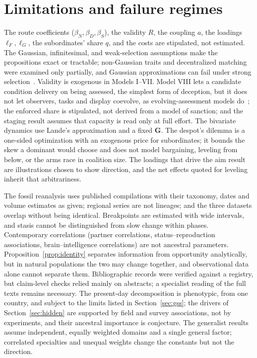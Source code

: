 \section{Limitations and failure regimes}\label{sec:limits}

\noindent The route coefficients ($\beta_N,\beta_D,\beta_S$), the validity $R$, the coupling $a$, the loadings
$\ell_F,\ell_G$, the subordinates' share $q$, and the costs are stipulated, not estimated. The Gaussian, infinitesimal, and
weak-selection assumptions make the propositions exact or tractable; non-Gaussian traits and decentralized matching were
examined only partially, and Gaussian approximations can fail under strong selection~\cite{turelli1994}. Validity is
exogenous in Models I--VII. Model VIII lets a candidate condition delivery on being assessed, the simplest form of
deception, but it does not let observers, tasks and display coevolve, as evolving-assessment models
do~\cite{gavrilets2006,baroudagues2022}; the enforced share is stipulated, not derived from a model of sanction; and the
staging result assumes that capacity is read only at full effort. The bivariate dynamics use Lande's approximation and a fixed $\mathbf G$. The
despot's dilemma is a one-sided optimization with an exogenous price for subordinates; it bounds the skew a dominant would
choose and does not model bargaining, leveling from below, or the arms race in coalition size. The loadings that drive the
aim result are illustrations chosen to show direction, and the net effects quoted for leveling inherit that arbitrariness.

The fossil reanalysis uses published compilations with their taxonomy, dates and volume estimates as given; regional series
are not lineages; and the three datasets overlap without being identical. Breakpoints are estimated with wide intervals, and
stasis cannot be distinguished from slow change within phases. Contemporary correlations (partner correlations,
status--reproduction associations, brain--intelligence correlations) are not ancestral parameters.
Proposition~\ref{prop:identity} separates information from opportunity analytically, but in natural populations the two may
change together, and observational data alone cannot separate them. Bibliographic records were verified against a registry,
but claim-level checks relied mainly on abstracts; a specialist reading of the full texts remains necessary.
The present-day decomposition is phenotypic, from one country, and subject to the limits listed in
Section~\ref{sec:gss}; the drivers of Section~\ref{sec:hidden} are supported by field and survey associations, not by
experiments, and their ancestral importance is conjecture. The generalist results assume independent, equally weighted
domains and a single general factor; correlated specialties and unequal weights change the constants but not the direction.

